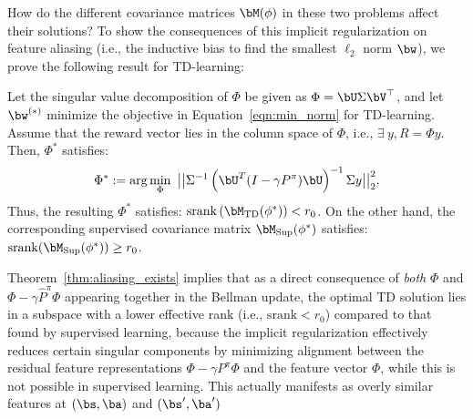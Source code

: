 How do the different covariance matrices $\bM(\phi)$ in these two problems affect their solutions? To show the consequences of this implicit regularization on feature aliasing (i.e., the inductive bias to find the smallest $\ell_2$ norm $\bw$),
we prove the following result for TD-learning:
\begin{theorem}
\label{thm:aliasing_exists}
Let the singular value decomposition of $\Phi$ be given as $\Phi = \bU \Sigma \bV^\top$, and let $\bw^{(*)}$ minimize the objective in Equation~\ref{eqn:min_norm} for TD-learning. Assume that the reward vector lies in the column space of $\Phi$, i.e., $\exists~ y, R = \Phi y $.  Then, $\Phi^*$ satisfies:
\begin{equation*}
    {\Phi^*} := \arg \min_{\Phi}~ \big|\big| \Sigma^{-1} \left( \bU^T (I - \gamma P^\pi) \bU \right)^{-1} \Sigma y\big|\big|_2^2.
\end{equation*}
Thus, the resulting ${\Phi^*}$ satisfies: $\mathrm{srank} \left(\bM_{\mathrm{TD}}(\phi^*)\right) < r_0$. On the other hand, the corresponding supervised covariance matrix $\bM_{\mathrm{Sup}}(\phi^*)$ satisfies: $\mathrm{srank}(\bM_{\mathrm{Sup}}(\phi^*)) \geq r_0$.
\end{theorem}
Theorem~\ref{thm:aliasing_exists} implies that as a direct consequence of \emph{both} $\Phi$ and $\Phi - \gamma \hat{P}^\pi \Phi$ appearing together in the Bellman update, the optimal TD solution lies in a subspace with a lower effective rank (i.e., $\mathrm{srank} < r_0$) compared to that found by supervised learning, because the implicit regularization effectively reduces certain singular components by
minimizing alignment between the residual feature representations $\Phi - \gamma P^\pi \Phi$ and the feature vector $\Phi$, while this is not possible in supervised learning. This actually manifests as overly similar features at $(\bs, \ba)$ and $(\bs', \ba')$
